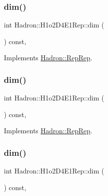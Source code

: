 \subsubsection{\texorpdfstring{dim()}{dim()}\hspace{0.1cm}{\footnotesize\ttfamily [3/5]}}
{\footnotesize\ttfamily int Hadron\+::\+H1o2\+D4\+E1\+Rep\+::dim (\begin{DoxyParamCaption}{ }\end{DoxyParamCaption}) const\hspace{0.3cm}{\ttfamily [inline]}, {\ttfamily [virtual]}}



Implements \mbox{\hyperlink{structHadron_1_1RepRep_a92c8802e5ed7afd7da43ccfd5b7cd92b}{Hadron\+::\+Rep\+Rep}}.

\mbox{\label{structHadron_1_1H1o2D4E1Rep_a835d31398fa4c01b94dad4fd64e3447c}} 
\subsubsection{\texorpdfstring{dim()}{dim()}\hspace{0.1cm}{\footnotesize\ttfamily [4/5]}}
{\footnotesize\ttfamily int Hadron\+::\+H1o2\+D4\+E1\+Rep\+::dim (\begin{DoxyParamCaption}{ }\end{DoxyParamCaption}) const\hspace{0.3cm}{\ttfamily [inline]}, {\ttfamily [virtual]}}



Implements \mbox{\hyperlink{structHadron_1_1RepRep_a92c8802e5ed7afd7da43ccfd5b7cd92b}{Hadron\+::\+Rep\+Rep}}.

\mbox{\label{structHadron_1_1H1o2D4E1Rep_a835d31398fa4c01b94dad4fd64e3447c}} 
\subsubsection{\texorpdfstring{dim()}{dim()}\hspace{0.1cm}{\footnotesize\ttfamily [5/5]}}
{\footnotesize\ttfamily int Hadron\+::\+H1o2\+D4\+E1\+Rep\+::dim (\begin{DoxyParamCaption}{ }\end{DoxyParamCaption}) const\hspace{0.3cm}{\ttfamily [inline]}, {\ttfamily [virtual]}}



